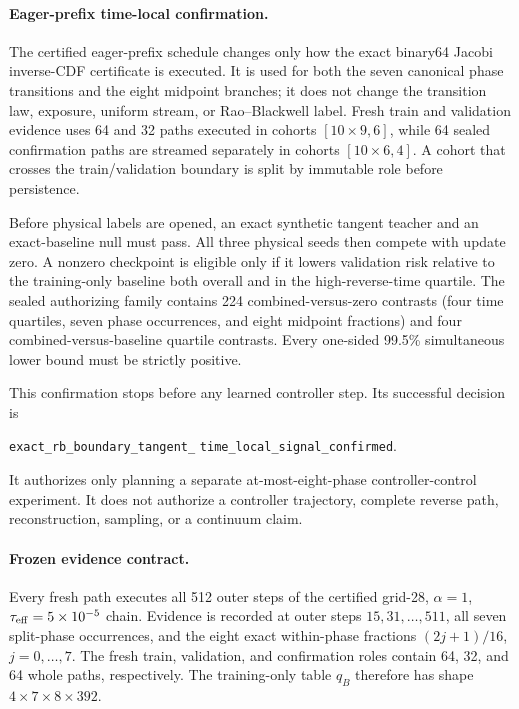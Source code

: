 \documentclass[11pt]{article}
\begin{document}
\paragraph{Eager-prefix time-local confirmation.}
The certified eager-prefix schedule changes only how the exact binary64
Jacobi inverse-CDF certificate is executed. It is used for both the seven
canonical phase transitions and the eight midpoint branches; it does not
change the transition law, exposure, uniform stream, or Rao--Blackwell label.
Fresh train and validation evidence uses 64 and 32 paths executed in cohorts
$[10\mathbin{\times}9,6]$, while 64 sealed confirmation paths are streamed
separately in cohorts $[10\mathbin{\times}6,4]$. A cohort that crosses the
train/validation boundary is split by immutable role before persistence.

Before physical labels are opened, an exact synthetic tangent teacher and an
exact-baseline null must pass. All three physical seeds then compete with
update zero. A nonzero checkpoint is eligible only if it lowers validation
risk relative to the training-only baseline both overall and in the
high-reverse-time quartile. The sealed authorizing family contains 224
combined-versus-zero contrasts (four time quartiles, seven phase occurrences,
and eight midpoint fractions) and four combined-versus-baseline quartile
contrasts. Every one-sided 99.5\% simultaneous lower bound must be strictly
positive.

This confirmation stops before any learned controller step. Its successful
decision is
\begin{center}
\texttt{exact\_rb\_boundary\_tangent\_}\newline
\texttt{time\_local\_signal\_confirmed}.
\end{center}
It
authorizes only planning a separate at-most-eight-phase controller-control
experiment. It does not authorize a controller trajectory, complete reverse
path, reconstruction, sampling, or a continuum claim.

\paragraph{Frozen evidence contract.}
Every fresh path executes all 512 outer steps of the certified grid-28,
$\alpha=1$, $\tau_{\rm eff}=5\times10^{-5}$ chain. Evidence is recorded at
outer steps $15,31,\ldots,511$, all seven split-phase occurrences, and the
eight exact within-phase fractions $(2j+1)/16$, $j=0,\ldots,7$. The fresh
train, validation, and confirmation roles contain 64, 32, and 64 whole paths,
respectively. The training-only table $q_B$ therefore has shape
$4\times7\times8\times392$.
\end{document}
